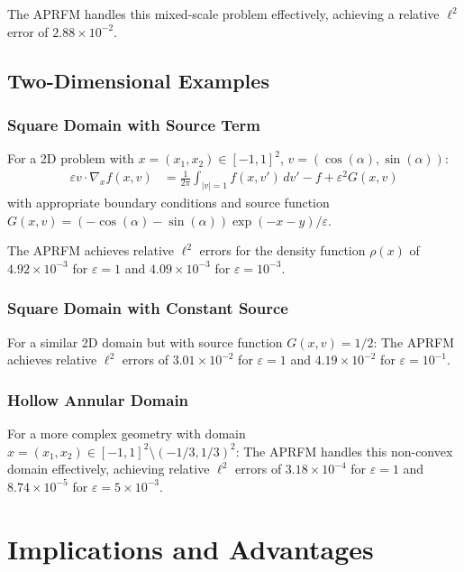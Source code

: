 \documentclass[11pt]{article}
\begin{document}
The APRFM handles this mixed-scale problem effectively, achieving a relative $\ell^2$ error of $2.88 \times 10^{-2}$.

\subsection{Two-Dimensional Examples}

\subsubsection{Square Domain with Source Term}

For a 2D problem with $x = (x_1, x_2) \in [-1,1]^2$, $v = (\cos(\alpha), \sin(\alpha))$:
\begin{align}
\varepsilon v \cdot \nabla_x f(x,v) &= \frac{1}{2\pi} \int_{|v|=1} f(x,v') \, dv' - f + \varepsilon^2 G(x,v)
\end{align}
with appropriate boundary conditions and source function $G(x,v) = (-\cos(\alpha) - \sin(\alpha)) \exp(-x-y)/\varepsilon$.

The APRFM achieves relative $\ell^2$ errors for the density function $\rho(x)$ of $4.92 \times 10^{-3}$ for $\varepsilon = 1$ and $4.09 \times 10^{-3}$ for $\varepsilon = 10^{-3}$.

\subsubsection{Square Domain with Constant Source}

For a similar 2D domain but with source function $G(x,v) = 1/2$:
The APRFM achieves relative $\ell^2$ errors of $3.01 \times 10^{-2}$ for $\varepsilon = 1$ and $4.19 \times 10^{-2}$ for $\varepsilon = 10^{-1}$.

\subsubsection{Hollow Annular Domain}

For a more complex geometry with domain $x = (x_1, x_2) \in [-1,1]^2 \setminus (-1/3, 1/3)^2$:
The APRFM handles this non-convex domain effectively, achieving relative $\ell^2$ errors of $3.18 \times 10^{-4}$ for $\varepsilon = 1$ and $8.74 \times 10^{-5}$ for $\varepsilon = 5 \times 10^{-3}$.

\section{Implications and Advantages}
\end{document}
